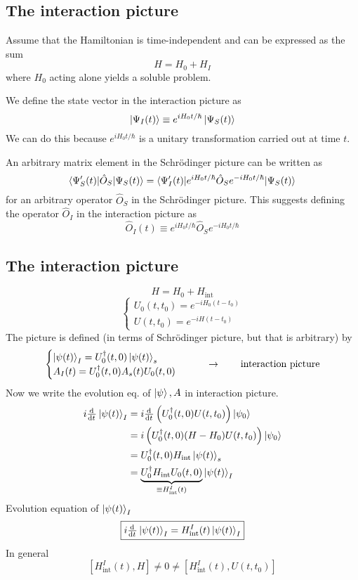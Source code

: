 \subsection{The interaction picture}
Assume that the Hamiltonian is time-independent and can be expressed as the sum
\[ H = H_0 + H_I \]
where $H_0$ acting alone yields a soluble problem.

We define the state vector in the interaction picture as
\[ \left| \Psi_I(t) \right\rangle \equiv e^{iH_0t / \hbar}\left| \Psi_S(t) \right\rangle \]
We can do this because $e^{iH_0t / \hbar}$ is a unitary transformation carried out at time $t$.

An arbitrary matrix element in the Schrödinger picture can be written as 
\[ \braket[\hat{O}_S]{\Psi'_S(t)}{\Psi_S(t)} = \braket[e^{iH_0t / \hbar}\hat{O}_S e^{-iH_0t / \hbar}]{\Psi'_I(t)}{\Psi_S(t)} \]
for an arbitrary operator $\hat{O}_S$ in the Schrödinger picture.
This suggests defining the operator $\hat{O}_I$ in the interaction picture as
\[ \hat{O}_I(t) \equiv e^{i H_0 t / \hbar}\hat{O}_S e^{-iH_0t / \hbar} \]







\subsection{The interaction picture}
\[ H = H_0 + H_\text{int} \]
\[ \begin{cases}
U_0(t,t_0) = e^{-iH_0(t-t_0)} \\
U(t,t_0) = e^{-iH(t-t_0)}
\end{cases} \]
The picture is defined (in terms of Schrödinger picture, but that is arbitrary) by
\[ \begin{cases}
\left| \psi(t) \right\rangle_I = U_0^\dagger(t,0)\left| \psi(t) \right\rangle_s \\
A_I(t) = U_0^\dagger(t,0)A_s(t)U_0(t,0)
\end{cases} \qquad \to \qquad \text{interaction picture}\]
Now we write the evolution eq. of $\left| \psi \right\rangle, A$ in interaction picture.
\begin{align*}
i \od{}{t}\ket{\psi(t)}_I &= i \od{}{t}\left(U_0^\dagger(t,0)U(t,t_0)\right)\ket{\psi_0} \\
&= i \left(U_0^\dagger(t,0)(H-H_0)U(t,t_0)\right)\ket{\psi_0} \\
&= U_0^\dagger(t,0)H_\text{int}\ket{\psi(t)}_s \\
&= \underbrace{U_0^\dagger H_\text{int}U_0(t,0)}_{\equiv H^I_\text{int}(t)}\ket{\psi(t)}_I
\end{align*}
Evolution equation of $\left| \psi(t) \right\rangle_I$
\[ \boxed{i \od{}{t}\ket{\psi(t)}_I = H^I_\text{int}(t)\ket{\psi(t)}_I} \]
In general
\[ \left[H^I_\text{int}(t),H\right] \neq 0 \neq \left[H^I_\text{int}(t),U(t,t_0)\right] \]

